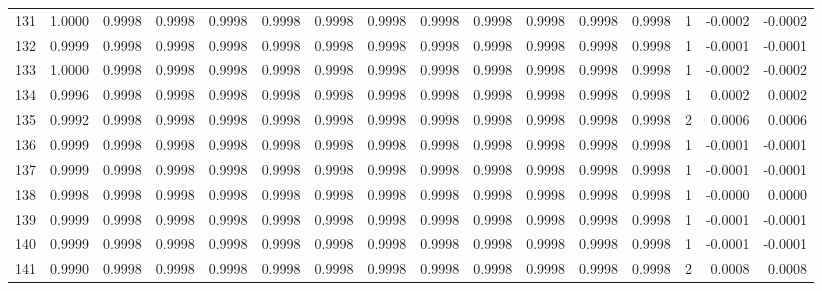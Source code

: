 \begin{tabular}{lrrrrrrrrrrrrrrr}
131 &      1.0000 &  0.9998 &  0.9998 &  0.9998 &  0.9998 &  0.9998 &  0.9998 &  0.9998 &  0.9998 &  0.9998 &   0.9998 &     0.9998 &      1 &                   -0.0002 &                    -0.0002 \\
132 &      0.9999 &  0.9998 &  0.9998 &  0.9998 &  0.9998 &  0.9998 &  0.9998 &  0.9998 &  0.9998 &  0.9998 &   0.9998 &     0.9998 &      1 &                   -0.0001 &                    -0.0001 \\
133 &      1.0000 &  0.9998 &  0.9998 &  0.9998 &  0.9998 &  0.9998 &  0.9998 &  0.9998 &  0.9998 &  0.9998 &   0.9998 &     0.9998 &      1 &                   -0.0002 &                    -0.0002 \\
134 &      0.9996 &  0.9998 &  0.9998 &  0.9998 &  0.9998 &  0.9998 &  0.9998 &  0.9998 &  0.9998 &  0.9998 &   0.9998 &     0.9998 &      1 &                    0.0002 &                     0.0002 \\
135 &      0.9992 &  0.9998 &  0.9998 &  0.9998 &  0.9998 &  0.9998 &  0.9998 &  0.9998 &  0.9998 &  0.9998 &   0.9998 &     0.9998 &      2 &                    0.0006 &                     0.0006 \\
136 &      0.9999 &  0.9998 &  0.9998 &  0.9998 &  0.9998 &  0.9998 &  0.9998 &  0.9998 &  0.9998 &  0.9998 &   0.9998 &     0.9998 &      1 &                   -0.0001 &                    -0.0001 \\
137 &      0.9999 &  0.9998 &  0.9998 &  0.9998 &  0.9998 &  0.9998 &  0.9998 &  0.9998 &  0.9998 &  0.9998 &   0.9998 &     0.9998 &      1 &                   -0.0001 &                    -0.0001 \\
138 &      0.9998 &  0.9998 &  0.9998 &  0.9998 &  0.9998 &  0.9998 &  0.9998 &  0.9998 &  0.9998 &  0.9998 &   0.9998 &     0.9998 &      1 &                   -0.0000 &                     0.0000 \\
139 &      0.9999 &  0.9998 &  0.9998 &  0.9998 &  0.9998 &  0.9998 &  0.9998 &  0.9998 &  0.9998 &  0.9998 &   0.9998 &     0.9998 &      1 &                   -0.0001 &                    -0.0001 \\
140 &      0.9999 &  0.9998 &  0.9998 &  0.9998 &  0.9998 &  0.9998 &  0.9998 &  0.9998 &  0.9998 &  0.9998 &   0.9998 &     0.9998 &      1 &                   -0.0001 &                    -0.0001 \\
141 &      0.9990 &  0.9998 &  0.9998 &  0.9998 &  0.9998 &  0.9998 &  0.9998 &  0.9998 &  0.9998 &  0.9998 &   0.9998 &     0.9998 &      2 &                    0.0008 &                     0.0008 \\

\end{tabular}
